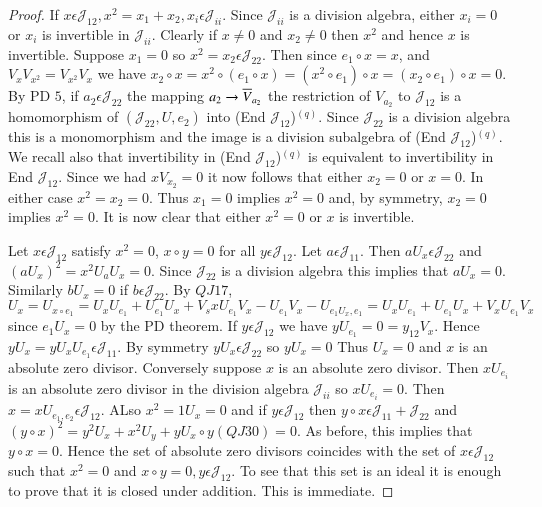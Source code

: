 \begin{proof}
If $x\epsilon \mathscr{J}_{12},x^{2}=x_1+x_2,x_i\epsilon
\mathscr{J}_{ii}$. Since $\mathscr{J}_{ii}$ is a division algebra,
either $x_i=0$ or $x_i$ is invertible in $\mathscr{J}_{ii}$. Clearly
if $x\neq 0$ and $x_2\neq 0$ then $x^{2}$ and hence $x$ is
invertible. Suppose $x_1=0$ so $x^{2}=x_2\epsilon
\mathscr{J}_{22}$. Then since $e_1\circ x=x$, and
$V_xV_{x^{2}}=V_{x^{2}}V_x$ we have $x_2\circ x=x^{2}\circ (e_1\circ
x)=(x^{2}\circ e_1)\circ x=(x_2\circ e_1)\circ x=0$. By PD $5$, if
$a_2\epsilon \mathscr{J}_{22}$ the mapping $a_2\to \overline{V}_{a_2}$ the
restriction of $V_{a_2}$ to $\mathscr{J}_{12}$ is a homomorphism of
$(\mathscr{J}_{22},U,e_{2})$ into (End
$\mathscr{J}_{12}$)$^{(q)}$. Since $\mathscr{J}_{22}$ is a division
algebra this is a monomorphism and  the image is a division subalgebra
of (End $\mathscr{J}_{12}$)$^{(q)}$. We recall also that invertibility
in (End $\mathscr{J}_{12}$)$^{(q)}$ is equivalent to invertibility in
End $\mathscr{J}_{12}$. Since we had $xV_{x_2}=0$ it now follows that
either $x_2=0$ or $x=0$. In either case $x^{2}=x_2=0$. Thus $x_1=0$
implies $x^{2}=0$ and, by symmetry, $x_2=0$ implies $x^{2}=0$. It is
now clear that either $x^{2}=0$ or $x$ is invertible.

Let $x\epsilon \mathscr{J}_{12}$ satisfy $x^{2}=0$, $x\circ y=0$ for
all $y\epsilon \mathscr{J}_{12}$. Let $a\epsilon
\mathscr{J}_{11}$. Then $aU_x\epsilon \mathscr{J}_{22}$ and
$(aU_x)^{2}=x^{2}U_aU_x=0$. Since $\mathscr{J}_{22}$ is a division
algebra this implies that $aU_x=0$. Similarly $bU_x=0$ if $b\epsilon
\mathscr{J}_{22}$. By $QJ 17$, $U_x=U_{x\circ
  e_1}=U_xU_{e_1}+U_{e_1}U_x+V_sxU_{e_1}V_x-U_{e_1}V_x-U_{e_{1}U_{x},e_{1}}=
U_xU_{e_1}+U_{e_1}U_x +V_xU_{e_1} V_x$ since $e_1U_x=0$ by the PD
theorem. If $y\epsilon \mathscr{J}_{12}$ we have
$yU_{e_{1}}=0=y_{12}V_x$. Hence $yU_x=yU_xU_{e_{1}}\epsilon
\mathscr{J}_{11}$. By symmetry $yU_x\epsilon \mathscr{J}_{22}$ so
$yU_x=0$ Thus $U_x=0$ and  $x$ is an absolute zero\pageoriginale
divisor. Conversely suppose $x$ is an absolute zero divisor. Then
$xU_{e_i}$ is an absolute zero divisor in the division algebra
$\mathscr{J}_{ii}$ so $xU_{e_{i}}=0$. Then $x=xU_{e_1,e_2}\epsilon
\mathscr{J}_{12}$. ALso $x^{2}=1U_x=0$ and if $y\epsilon
\mathscr{J}_{12}$ then $y\circ x\epsilon
\mathscr{J}_{11}+\mathscr{J}_{22}$ and $(y\circ
x)^{2}=y^{2}U_x+x^{2}U_y+yU_x\circ y(QJ 30)=0$. As before, this
implies that $y\circ x=0$. Hence the set of absolute zero divisors
coincides with the set of $x\epsilon \mathscr{J}_{12}$ such that
$x^{2}=0$ and $x\circ y=0,y\epsilon \mathscr{J}_{12}$. To see that
this set is an ideal it is enough to prove that it is closed under
addition. This is immediate.


\end{proof}
